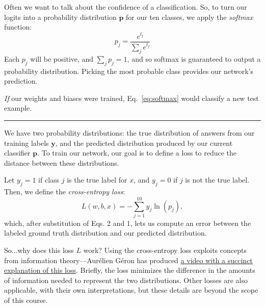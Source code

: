 Often we want to talk about the confidence of a classification. So, to turn our logits into a probability distribution $\mathbf{p}$ for our ten classes, we apply the \emph{softmax} function:
\begin{equation}
    p_j = \frac{e^{l_j}}{\sum_je^{l_j}}
   \label{eq:softmax}
\end{equation}
Each $p_j$ will be positive, and $\sum_jp_j = 1$, and so softmax is guaranteed to output a probability distribution. Picking the most probable class provides our network's prediction.

\emph{If} our weights and biases were trained, Eq.~\ref{eq:softmax} would classify a new test example.

\hspace{\fill}\rule{0.5\linewidth}{.5pt}\hspace{\fill}

We have two probability distributions: the true distribution of answers from our training labels $\mathbf{y}$, and the predicted distribution produced by our current classifier $\mathbf{p}$. To train our network, our goal is to define a loss to reduce the distance between these distributions. 

Let $y_j=1$ if class $j$ is the true label for $x$, and $y_j = 0$ if $j$ is not the true label. Then, we define the \emph{cross-entropy loss}:
\begin{equation}
    L(w,b,x) = - \sum_{j=1}^{10}y_j\ln(p_j),
\end{equation}
which, after substitution of Eqs. 2 and 1, lets us compute an error between the labeled ground truth distribution and our predicted distribution.

So...why does this loss $L$ work? Using the cross-entropy loss exploits concepts from information theory---Aur\'{e}lien G\'{e}ron has produced \href{https://www.youtube.com/watch?v=ErfnhcEV1O8}{a video with a succinct explanation of this loss}. Briefly, the loss minimizes the difference in the amounts of information needed to represent the two distributions. Other losses are also applicable, with their own interpretations, but these details are beyond the scope of this course.

